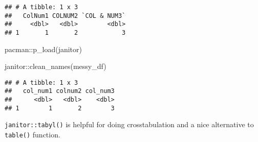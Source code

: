 \documentclass[
]{book}
\newenvironment{Shaded}{\begin{snugshade}}{\end{snugshade}}
\newcommand{\CommentTok}[1]{\textcolor[rgb]{0.56,0.35,0.01}{\textit{#1}}}
\newcommand{\FunctionTok}[1]{\textcolor[rgb]{0.00,0.00,0.00}{#1}}
\newcommand{\NormalTok}[1]{#1}
\newcommand{\SpecialCharTok}[1]{\textcolor[rgb]{0.00,0.00,0.00}{#1}}
\begin{document}
\begin{verbatim}
## # A tibble: 1 x 3
##   ColNum1 COLNUM2 `COL & NUM3`
##     <dbl>   <dbl>        <dbl>
## 1       1       2            3
\end{verbatim}

\begin{Shaded}
\begin{Highlighting}[]
\NormalTok{pacman}\SpecialCharTok{::}\FunctionTok{p\_load}\NormalTok{(janitor)}

\NormalTok{janitor}\SpecialCharTok{::}\FunctionTok{clean\_names}\NormalTok{(messy\_df) }
\end{Highlighting}
\end{Shaded}

\begin{verbatim}
## # A tibble: 1 x 3
##   col_num1 colnum2 col_num3
##      <dbl>   <dbl>    <dbl>
## 1        1       2        3
\end{verbatim}

\texttt{janitor::tabyl()} is helpful for doing crosstabulation and a nice alternative to \texttt{table()} function.

\begin{Shaded}
\end{Shaded}
\end{document}
